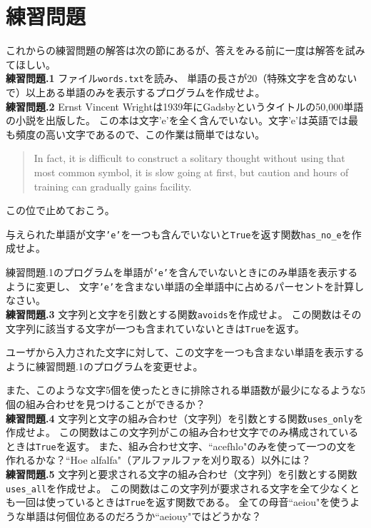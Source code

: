 \documentclass[a4j,12pt,makeidx]{jbook}
\newcommand{\tp}{\thechapter}
\begin{document}
\section{練習問題}
これからの練習問題の解答は次の節にあるが、答えをみる前に一度は解答を試みてほしい。\\

\noindent
{\bf 練習問題\tp.1} ファイル{\tt words.txt}を読み、
単語の長さが20（特殊文字を含めないで）以上ある単語のみを表示するプログラムを作成せよ。\\

\noindent
{\bf 練習問題\tp.2} Ernst Vincent Wrightは1939年にGadsbyというタイトルの50,000単語の小説を出版した。
この本は文字'e'を全く含んでいない。文字'e'は英語では最も頻度の高い文字であるので、この作業は簡単ではない。
\begin{quote}
In fact, it is difficult to construct a solitary thought without using that most common symbol, it is slow going at first, but caution and hours of training can gradually gains facility.
\end{quote}
この位で止めておこう。 \par
与えられた単語が文字{\tt 'e'}を一つも含んでいないと{\tt True}を返す関数{\tt has\_no\_e}を作成せよ。\par
練習問題{\tp.1}のプログラムを単語が{\tt 'e'}を含んでいないときにのみ単語を表示するように変更し、
文字{\tt 'e'}を含まない単語の全単語中に占めるパーセントを計算しなさい。\\

\noindent
{\bf 練習問題\tp.3} 文字列と文字を引数とする関数{\tt avoids}を作成せよ。
この関数はその文字列に該当する文字が一つも含まれていないときは{\tt True}を返す。 \par
ユーザから入力された文字に対して、この文字を一つも含まない単語を表示するように練習問題{\tp.1}のプログラムを変更せよ。\par
また、このような文字5個を使ったときに排除される単語数が最少になるような5個の組み合わせを見つけることができるか？\\

\noindent
{\bf 練習問題\tp.4} 文字列と文字の組み合わせ（文字列）を引数とする関数{\tt uses\_only}を作成せよ。
この関数はこの文字列がこの組み合わせ文字でのみ構成されているときは{\tt True}を返す。
また、組み合わせ文字、``acefhlo"のみを使って一つの文を作れるかな？``Hoe alfalfa"（アルファルファを刈り取る）以外には？ \\

\noindent
{\bf 練習問題\tp.5} 文字列と要求される文字の組み合わせ（文字列）を引数とする関数{\tt uses\_all}を作成せよ。
この関数はこの文字列が要求される文字を全て少なくとも一回は使っているときは{\tt True}を返す関数である。
全ての母音``aeiou"を使うような単語は何個位あるのだろうか``aeiouy"ではどうかな？ \\
\end{document}
